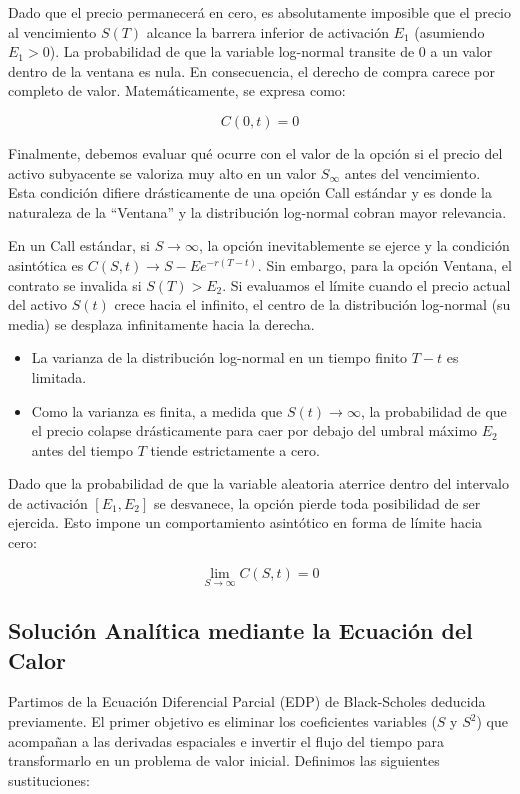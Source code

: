 \documentclass[12pt, a4paper]{article}
\begin{document}
Dado que el precio permanecerá en cero, es absolutamente imposible que el precio al vencimiento $S(T)$ alcance la barrera inferior de activación $E_1$ (asumiendo $E_1 > 0$). La probabilidad de que la variable log-normal transite de 0 a un valor dentro de la ventana es nula. En consecuencia, el derecho de compra carece por completo de valor. Matemáticamente, se expresa como:

\[ C(0, t) = 0 \]

Finalmente, debemos evaluar qué ocurre con el valor de la opción si el precio del activo subyacente se valoriza muy alto en un valor $S_{\infty}$ antes del vencimiento. Esta condición difiere drásticamente de una opción Call estándar y es donde la naturaleza de la ``Ventana'' y la distribución log-normal cobran mayor relevancia.

En un Call estándar, si $S \to \infty$, la opción inevitablemente se ejerce y la condición asintótica es $C(S,t) \to S - Ee^{-r(T-t)}$. Sin embargo, para la opción Ventana, el contrato se invalida si $S(T) > E_2$. Si evaluamos el límite cuando el precio actual del activo $S(t)$ crece hacia el infinito, el centro de la distribución log-normal (su media) se desplaza infinitamente hacia la derecha.

\begin{itemize}
    \item La varianza de la distribución log-normal en un tiempo finito $T-t$ es limitada.
    \item Como la varianza es finita, a medida que $S(t) \to \infty$, la probabilidad de que el precio colapse drásticamente para caer por debajo del umbral máximo $E_2$ antes del tiempo $T$ tiende estrictamente a cero.
\end{itemize}

Dado que la probabilidad de que la variable aleatoria aterrice dentro del intervalo de activación $[E_1, E_2]$ se desvanece, la opción pierde toda posibilidad de ser ejercida. Esto impone un comportamiento asintótico en forma de límite hacia cero:

\[ \lim_{S \to \infty} C(S, t) = 0 \]

\subsection{Solución Analítica mediante la Ecuación del Calor}

Partimos de la Ecuación Diferencial Parcial (EDP) de Black-Scholes deducida previamente. El primer objetivo es eliminar los coeficientes variables ($S$ y $S^2$) que acompañan a las derivadas espaciales e invertir el flujo del tiempo para transformarlo en un problema de valor inicial. Definimos las siguientes sustituciones:
\end{document}
